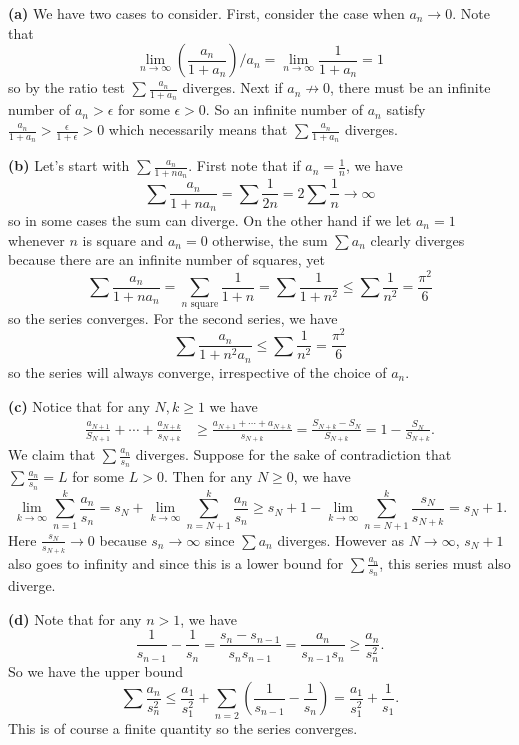 \documentclass[11pt,letterpaper]{article}
\begin{document}
\begin{solution}
    \textbf{(a)} We have two cases to consider. First, consider the case when $a_n\to 0$. Note that 
    \[
        \lim_{n\to \infty}\left(\frac{a_n}{1+a_n}\right)/a_n = \lim_{n\to \infty} \frac{1}{1+a_n} = 1
    \]
    so by the ratio test $\sum \frac{a_n}{1+a_n}$ diverges. Next if $a_n\not\to 0$, there must be an infinite number of $a_n>\epsilon$ for some $\epsilon>0$. So an infinite number of $a_n$ satisfy $\frac{a_n}{1+a_n} > \frac{\epsilon}{1+\epsilon} > 0$ which necessarily means that $\sum \frac{a_n}{1+a_n}$ diverges.

    \textbf{(b)} Let's start with $\sum \frac{a_n}{1+na_n}$. First note that if $a_n=\frac{1}{n}$, we have
    \[
        \sum \frac{a_n}{1+na_n} = \sum \frac{1}{2n} = 2\sum \frac{1}{n} \to \infty
    \]
    so in some cases the sum can diverge. On the other hand if we let $a_n=1$ whenever $n$ is square and $a_n=0$ otherwise, the sum $\sum a_n$ clearly diverges because there are an infinite number of squares, yet
    \[
        \sum \frac{a_n}{1+na_n} = \sum_{n\textrm{ square}} \frac{1}{1+n} = \sum \frac{1}{1+n^2}\leq \sum \frac{1}{n^2} = \frac{\pi^2}{6}
    \]
    so the series converges. For the second series, we have
    \[
        \sum \frac{a_n}{1+n^2a_n} \leq \sum \frac{1}{n^2} = \frac{\pi^2}{6} 
    \]
    so the series will always converge, irrespective of the choice of $a_n$.   
    
    \textbf{(c)} Notice that for any $N,k\geq 1$ we have 
    \[
        \begin{aligned}
            \frac{a_{N+1}}{S_{N+1}}+\cdots+\frac{a_{N+k}}{s_{N+k}}&\geq \frac{a_{N+1}+\cdots+a_{N+k}}{s_{N+k}}=\frac{S_{N+k}-S_N}{S_{N+k}} = 1-\frac{S_N}{S_{N+k}}.
        \end{aligned}
    \] 
    We claim that $\sum \frac{a_n}{s_n}$ diverges. Suppose for the sake of contradiction that $\sum \frac{a_n}{s_n}=L$ for some $L>0$. Then for any $N\geq 0$, we have
    \[
        \lim_{k\to \infty}\sum^k_{n=1}\frac{a_n}{s_n} = s_N+\lim_{k\to\infty}\sum^k_{n=N+1}\frac{a_n}{s_n} \geq s_N + 1-\lim_{k\to \infty}\sum^k_{n=N+1}\frac{s_N}{s_{N+k}} = s_N+1
    .\] 
    Here $\frac{s_N}{s_{N+k}}\to 0$ because $s_n\to \infty$ since $\sum a_n$ diverges. However as $N\to\infty$, $s_N+1$ also goes to infinity and since this is a lower bound for $\sum \frac{a_n}{s_n}$, this series must also diverge. 
    
    \textbf{(d)} Note that for any $n>1$, we have
    \[
        \frac{1}{s_{n-1}}-\frac{1}{s_n} = \frac{s_n - s_{n-1}}{s_n s_{n-1}} = \frac{a_n}{s_{n-1}s_n}\geq \frac{a_n}{s_n^2}
    .\] 
    So we have the upper bound
    \[
        \sum \frac{a_n}{s_n^2} \leq \frac{a_1}{s_1^2}+ \sum_{n=2}\left(\frac{1}{s_{n-1}} - \frac{1}{s_{n}}\right) = \frac{a_1}{s_1^2} + \frac{1}{s_1}
    .\] 
    This is of course a finite quantity so the series converges.
\end{solution}
\end{document}

